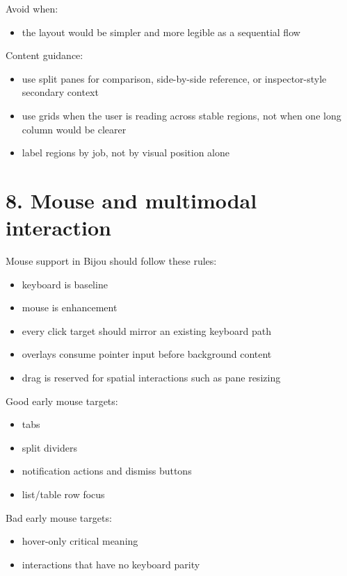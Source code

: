 Avoid when:

\begin{itemize}
\tightlist
\item
  the layout would be simpler and more legible as a sequential flow
\end{itemize}

Content guidance:

\begin{itemize}
\tightlist
\item
  use split panes for comparison, side-by-side reference, or inspector-style secondary context
\item
  use grids when the user is reading across stable regions, not when one long column would be clearer
\item
  label regions by job, not by visual position alone
\end{itemize}

\section{8. Mouse and multimodal interaction}\label{record-023-mouse-and-multimodal-interaction}

Mouse support in Bijou should follow these rules:

\begin{itemize}
\tightlist
\item
  keyboard is baseline
\item
  mouse is enhancement
\item
  every click target should mirror an existing keyboard path
\item
  overlays consume pointer input before background content
\item
  drag is reserved for spatial interactions such as pane resizing
\end{itemize}

Good early mouse targets:

\begin{itemize}
\tightlist
\item
  tabs
\item
  split dividers
\item
  notification actions and dismiss buttons
\item
  list/table row focus
\end{itemize}

Bad early mouse targets:

\begin{itemize}
\tightlist
\item
  hover-only critical meaning
\item
  interactions that have no keyboard parity
\end{itemize}

